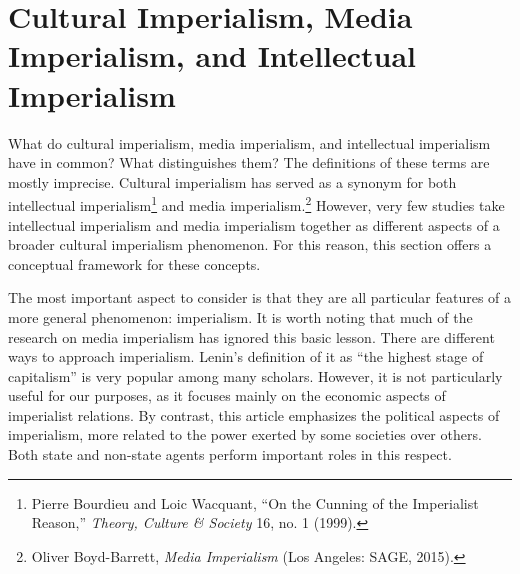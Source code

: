 \documentclass{tufte-handout}
\begin{document}
\hypertarget{cultural-imperialism-media-imperialism-and-intellectual-imperialism}{%
\section{Cultural Imperialism, Media Imperialism, and Intellectual\\\noindent Imperialism}\label{cultural-imperialism-media-imperialism-and-intellectual-imperialism}}

What do cultural imperialism, media imperialism, and intellectual
imperialism have in common? What distinguishes them? The definitions of
these terms are mostly imprecise. Cultural imperialism has served as a
synonym for both intellectual imperialism\footnote{Pierre Bourdieu and
  Loic Wacquant, ``On the Cunning of the Imperialist Reason,''
  \emph{Theory, Culture \& Society} 16, no. 1 (1999).} and media
imperialism.\footnote{Oliver Boyd-Barrett, \emph{Media Imperialism} (Los
  Angeles: SAGE, 2015).} However, very few studies take intellectual
imperialism and media imperialism together as different aspects of a
broader cultural imperialism phenomenon. For this reason, this section
offers a conceptual framework for these concepts.

The most important aspect to consider is that they are all particular
features of a more general phenomenon: imperialism. It is worth noting
that much of the research on media imperialism has ignored this basic
lesson. There are different ways to approach imperialism. Lenin's
definition of it as ``the highest stage of capitalism'' is very popular
among many scholars. However, it is not particularly useful for our
purposes, as it focuses mainly on the economic aspects of imperialist
relations. By contrast, this article emphasizes the political aspects of
imperialism, more related to the power exerted by some societies over
others. Both state and non-state agents perform important roles in this
respect.
\end{document}
